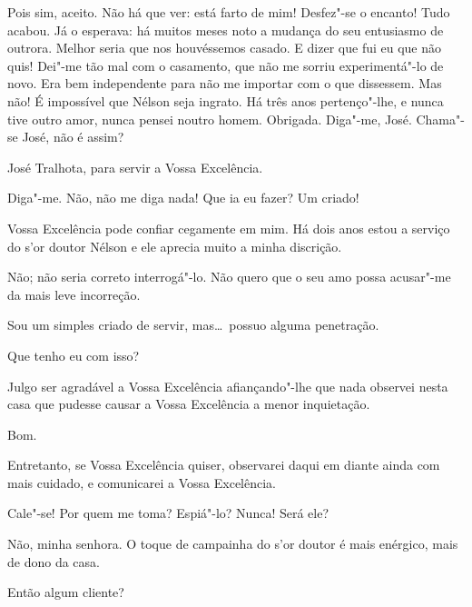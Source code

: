   Pois sim, aceito.  Não há que ver: está farto de
mim! Desfez"-se o encanto! Tudo acabou. Já o esperava: há muitos meses
noto a mudança do seu entusiasmo de outrora. Melhor seria que nos
houvéssemos casado. E dizer que fui eu que não quis! Dei"-me tão mal com
o casamento, que não me sorriu experimentá"-lo de novo. Era bem
independente para não me importar com o que dissessem.
Mas não! É impossível que Nélson seja ingrato. Há três anos
pertenço"-lhe, e nunca tive outro amor, nunca pensei noutro homem.
Obrigada.  Diga"-me, José.  Chama"-se
José, não é assim?

  José Tralhota, para servir a Vossa Excelência.

 Diga"-me.  Não, não me diga
nada!  Que ia eu fazer? Um criado!

  Vossa Excelência pode confiar cegamente em mim. Há dois anos
estou a serviço do s'or doutor Nélson e ele aprecia
muito a minha discrição.

  Não; não seria correto interrogá"-lo. Não quero que o seu amo
possa acusar"-me da mais leve incorreção.

  Sou um simples criado de servir, mas\ldots\ possuo alguma
penetração.

  Que tenho eu com isso?

  Julgo ser agradável a Vossa Excelência afiançando"-lhe
que nada observei nesta casa que pudesse causar a Vossa Excelência a
menor inquietação.

  Bom.

  Entretanto, se Vossa Excelência quiser, observarei daqui
em diante ainda com mais cuidado, e comunicarei a Vossa Excelência.

  Cale"-se! Por quem me toma? Espiá"-lo? Nunca!
 Será ele?

  Não, minha senhora. O toque de campainha do
s'or doutor é mais enérgico, mais de dono da casa.

  Então algum cliente?

